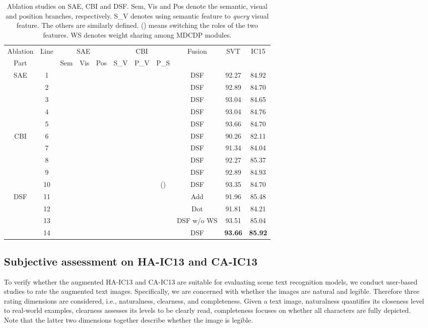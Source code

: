 \begin{table*}[h]
\centering
\caption{Ablation studies on SAE, CBI and DSF. Sem, Vis and Pos denote the semantic, visual and position branches, respectively. S\_V denotes using semantic feature to \emph{query} visual feature. The others are similarly defined. () means switching the roles of the two features. WS denotes weight sharing among MDCDP modules.}
\begin{tabular}{c|c|ccc|ccc|c|c c}
\hline
Ablation & \multirow{2}{*}{Line} &\multicolumn{3}{c|}{SAE} & \multicolumn{3}{c|}{CBI} & \multirow{2}{*}{Fusion}  & \multirow{2}{*}{SVT} & \multirow{2}{*}{IC15} \\
Part& & Sem & Vis & Pos & S\_V & P\_V & P\_S & & \\
\hline
\multirow{5}{*}{SAE} &1& & & & &  &  & DSF &92.27 & 84.92 \\
&2& &  & &  &  &  & DSF &92.89 & 84.70 \\
&3& &  &  & &  &  & DSF & 93.04 & 84.65 \\
&4&  &  &  &  &  &  & DSF & 93.04 & 84.76 \\
&5&  &  &  &  &  &  & DSF & 93.66 & 84.70 \\
\hline
\multirow{5}{*}{CBI}&6 &&&  & &  & & DSF & 90.26 & 82.11 \\
&7&& &  &  & & & DSF &91.34 & 84.04 \\
&8&& &  &  & &  & DSF & 92.27 & 85.37 \\
&9&& &  &  &  & & DSF & 92.89 & 84.93 \\
&10&& & & &  & () & DSF & 93.35 & 84.70 \\
\hline
\multirow{3}{*}{DSF}&11&& &  & &  &  & Add & 91.96 & 85.48 \\
&12&& &  & &  &  & Dot & 91.81 & 84.21 \\
&13&& &  & &  &  & DSF w/o WS & 93.51& 85.04 \\
\hline
&14&& &  & &  &  & DSF & \textbf{93.66} & \textbf{85.92} \\
\hline
\end{tabular}
\label{table: Ablation study}
\end{table*}


\subsection{Subjective assessment on HA-IC13 and CA-IC13}
To verify whether the augmented HA-IC13 and CA-IC13 are suitable for evaluating scene text recognition models, we conduct user-based studies to rate the augmented text images. Specifically, we are concerned with whether the images are natural and legible. Therefore three rating dimensions are considered, i.e., naturalness, clearness, and completeness. Given a text image, naturalness quantifies its closeness level to real-world examples, clearness assesses its levels to be clearly read, completeness focuses on whether all characters are fully depicted. Note that the latter two dimensions together describe whether the image is legible.

